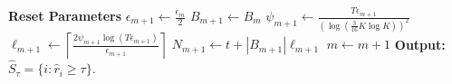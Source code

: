 \begin{algorithm}[t!]
\begin{algorithmic}
\vspace{-2mm}
\State {}
\State \textbf{Reset Parameters}
\State $\epsilon_{m+1}\leftarrow\frac{\epsilon_{m}}{2}$
\State $B_{m+1} \leftarrow B_{m}$
\State $\psi_{m+1}\leftarrow \frac{T\epsilon_{m+1}}{(\log(\frac{3}{16}K\log K))^{2}}$
\State $\ell_{m+1}\leftarrow\left\lceil \frac{2\psi_{m+1}\log( T\epsilon_{m+1})}{\epsilon_{m+1}} \right\rceil$
\State $N_{m+1} \leftarrow t + |B_{m+1}|\ell_{m+1}$
\State $m \leftarrow m+1$
\EndIf
\EndFor
\State \textbf{Output:} $\hat{S}_{\tau}=\lbrace i: \hat{r}_{i}\geq \tau \rbrace$.
\end{algorithmic}
\end{algorithm}


